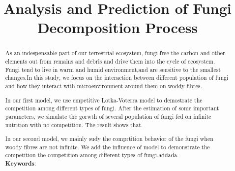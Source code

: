 \documentclass[12pt]{article}
\title{Analysis and Prediction of Fungi Decomposition Process}
\begin{document}
	\begin{abstract}
		As an indespensable part of our terrestrial ecosystem, fungi free the carbon and other elements out from remains and debris and drive them into the cycle of ecosystem. Fungi tend to live in warm and humid environment,and are sensitive to the smallest changes.In this study, we focus on the interaction between different population of fungi and how they interact with microenvironment around them on woddy fibres. 

		In our first model, we use cmpetitive Lotka-Voterra model to demostrate the competition among different types of fungi. After the estimation of some important parameters, we simulate the gorwth of several population of  fungi  fed on infinite nutrition with no competition. The result shows that.
		
		In our second model, we mainly sudy the comprtition behavior of the fungi when woody fibres are not infinite. We add the influence of model to demonstrate the competition the competition among different types of fungi.addada. \\
		\vspace{5pt}
		\textbf{Keywords}:
	\end{abstract}
	
	\maketitle
	\tableofcontents
	
	
	
	
	
	
	
	
\end{document}
